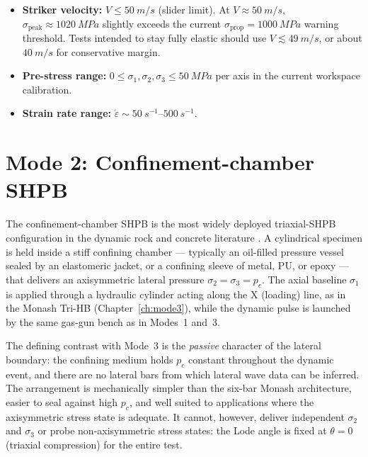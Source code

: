 \documentclass[11pt,a4paper,openany]{book}
\providecommand{\SI}[2]{\qty{#1}{#2}}
\providecommand{\SIrange}[3]{\qtyrange{#1}{#2}{#3}}
\theoremstyle{handbook}
\newcommand{\sig}{\sigma}
\newcommand{\eps}{\varepsilon}
\newcommand{\epsdot}{\dot\eps}
\newcommand{\sigprop}{\sig_{\text{prop}}}
\newcommand{\sigpeak}{\sig_{\text{peak}}}
\begin{document}
\begin{itemize}[leftmargin=*]
  \item \textbf{Striker velocity:} $V\le\SI{50}{m/s}$ (slider limit). At
        $V\approx\SI{50}{m/s}$, $\sigpeak\approx\SI{1020}{MPa}$ slightly
        exceeds the current $\sigprop=\SI{1000}{MPa}$ warning threshold.
        Tests intended to stay fully elastic should use
        $V\lesssim\SI{49}{m/s}$, or about $\SI{40}{m/s}$ for conservative
        margin.
  \item \textbf{Pre-stress range:} $0\le\sig_1,\sig_2,\sig_3\le\SI{50}{MPa}$
        per axis in the current workspace calibration.
  \item \textbf{Strain rate range:} $\epsdot\sim\SIrange{50}{500}{s^{-1}}$.
\end{itemize}

\chapter{Mode 2: Confinement-chamber SHPB}\label{ch:mode2}

The confinement-chamber SHPB is the most widely deployed triaxial-SHPB
configuration in the dynamic rock and concrete literature
\cite{ChenSong2011,Zhou2010,ZhangZhao2014,Zhang2022,WangZhang2026}. A cylindrical specimen is held
inside a stiff confining chamber --- typically an oil-filled pressure
vessel sealed by an elastomeric jacket, or a confining sleeve of metal,
PU, or epoxy --- that delivers an axisymmetric lateral pressure
$\sig_2=\sig_3=p_c$. The axial baseline $\sig_1$ is applied through a
hydraulic cylinder acting along the X (loading) line, as in the Monash
Tri-HB (Chapter~\ref{ch:mode3}), while the dynamic pulse is launched by
the same gas-gun bench as in Modes~1 and~3.

The defining contrast with Mode~3 is the \emph{passive} character of the
lateral boundary: the confining medium holds $p_c$ constant throughout
the dynamic event, and there are no lateral bars from which lateral wave
data can be inferred. The arrangement is mechanically simpler than the
six-bar Monash architecture, easier to seal against high $p_c$, and well
suited to applications where the axisymmetric stress state is adequate.
It cannot, however, deliver independent $\sig_2$ and $\sig_3$ or probe
non-axisymmetric stress states: the Lode angle is fixed at
$\theta=0$ (triaxial compression) for the entire test.
\end{document}
